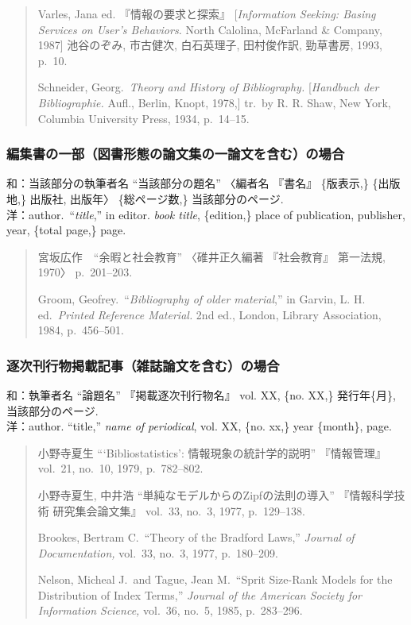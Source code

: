 \documentclass[b5paper,10pt,twocolumn,tombow]{jarticle}
\begin{document}
\begin{quote}
  Varles, Jana ed. 『情報の要求と探索』 [\textit{Information Seeking:
  Basing Services on User's Behaviors.} North Calolina,
  McFarland \& Company, 1987] 池谷のぞみ, 市古健次, 白石英理子, 田村俊作訳,
  勁草書房, 1993, p.~10.

  Schneider, Georg.\ \textit{Theory and History of Bibliography.}
  [\textit{Handbuch der Bibliographie.} Aufl., Berlin, Knopt, 1978,]
  tr.\ by R. R. Shaw, New York, Columbia University Press, 1934, p.~14--15.
\end{quote}

\subsubsection{編集書の一部（図書形態の論文集の一論文を含む）の場合}
\noindent{}和：当該部分の執筆者名 ``当該部分の題名'' 〈編者名 『書名』 \{版表示,\} \{出版地,\} 出版社, 出版年〉 \{総ページ数,\} 当該部分のページ. \bigskip \\
洋：author.\ ``\textit{title},'' in editor. \textit{book title}, \{edition,\} place of publication,
publisher, year, \{total page,\} page.

\begin{quote}
  宮坂広作　``余暇と社会教育'' 〈碓井正久編著 『社会教育』 第一法規,
  1970〉 p.~201--203.

  Groom, Geofrey.\ ``\textit{Bibliography of older material},'' in Garvin,
  L. H. ed.\ \textit{Printed Reference Material.} 2nd ed., London, Library
  Association, 1984, p.~456--501.
\end{quote}


\subsubsection{逐次刊行物掲載記事（雑誌論文を含む）の場合}
\noindent{}和：執筆者名 ``論題名'' 『掲載逐次刊行物名』 vol. XX,
\{no. XX,\} 発行年\{月\}, 当該部分のページ.\\
洋：author. ``title,'' \textit{name of periodical}, vol. XX,
\{no. xx,\} year \{month\}, page.


\begin{quote}
  小野寺夏生 ```Bibliostatistics': 情報現象の統計学的説明'' 『情報管理』
  vol.~21, no.~10, 1979, p.~782--802.

  小野寺夏生, 中井浩 ``単純なモデルからのZipfの法則の導入'' 『情報科学技術
  研究集会論文集』 vol.~33, no.~3, 1977, p.~129--138.

  Brookes, Bertram C.\ ``Theory of the Bradford Laws,'' \textit{Journal of
  Documentation,} vol.~33, no.~3, 1977, p.~180--209.

  Nelson, Micheal J.\ and Tague, Jean M.\ ``Sprit Size-Rank Models for the
  Distribution of Index Terms,'' \textit{Journal of the American Society
  for Information Science,} vol.~36, no.~5, 1985, p.~283--296.
\end{quote}
\end{document}
